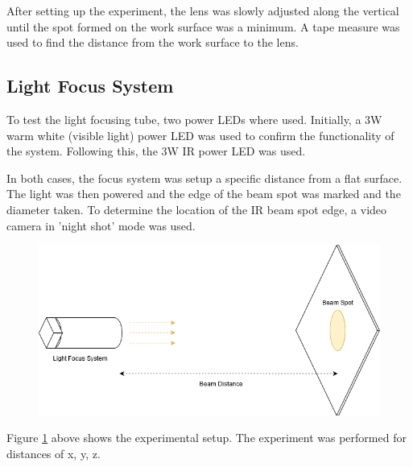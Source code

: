After setting up the experiment, the lens was slowly adjusted along the vertical until the spot formed on the work surface was a minimum. A tape measure was used to find the distance from the work surface to the lens.

\subsection{Light Focus System}

To test the light focusing tube, two power LEDs where used. Initially, a 3W warm white (visible light) power LED was used to confirm the functionality of the system. Following this, the 3W IR power LED was used.

In both cases, the focus system was setup a specific distance from a flat surface. The light was then powered and the edge of the beam spot was marked and the diameter taken. To determine the location of the IR beam spot edge, a video camera in 'night shot' mode was used.

\begin{figure}[H]
	\centering
	\includegraphics[width=.7\linewidth]{figures/experimentation/beam_spot_experiement.png}
	\label{fig:focus_system_experiemnt}
\end{figure}

Figure \ref{fig:focus_system_experiemnt} above shows the experimental setup. The experiment was performed for distances of x, y, z.
















\newpage
